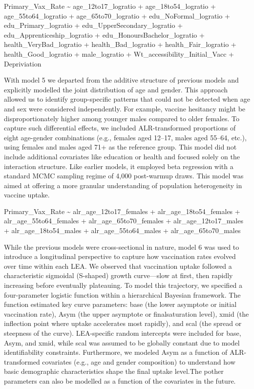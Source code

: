 \documentclass{article}
\begin{document}
Primary\_Vax\_Rate \textasciitilde{} age\_12to17\_logratio +
age\_18to54\_logratio + age\_55to64\_logratio + age\_65to70\_logratio +
edu\_NoFormal\_logratio + edu\_Primary\_logratio +
edu\_UpperSecondary\_logratio + edu\_Apprenticeship\_logratio +
edu\_HonoursBachelor\_logratio + health\_VeryBad\_logratio +
health\_Bad\_logratio + health\_Fair\_logratio + health\_Good\_logratio
+ male\_logratio + Wt\_accessibility\_Initial\_Vacc + Depriviation

With model 5 we departed from the additive structure of previous models
and explicitly modelled the joint distribution of age and gender. This
approach allowed us to identify group-specific patterns that could not
be detected when age and sex were considered independently. For example,
vaccine hesitancy might be disproportionately higher among younger males
compared to older females. To capture such differential effects, we
included ALR-transformed proportions of eight age-gender combinations
(e.g., females aged 12--17, males aged 55--64, etc.), using females and
males aged 71+ as the reference group. This model did not include
additional covariates like education or health and focused solely on the
interaction structure. Like earlier models, it employed beta regression
with a standard MCMC sampling regime of 4,000 post-warmup draws. This
model was aimed at offering a more granular understanding of population
heterogeneity in vaccine uptake.

Primary\_Vax\_Rate \textasciitilde{} alr\_age\_12to17\_females +
alr\_age\_18to54\_females + alr\_age\_55to64\_females +
alr\_age\_65to70\_females + alr\_age\_12to17\_males +
alr\_age\_18to54\_males + alr\_age\_55to64\_males +
alr\_age\_65to70\_males

While the previous models were cross-sectional in nature, model 6 was
used to introduce a longitudinal perspective to capture how vaccination
rates evolved over time within each LEA. We observed that vaccination
uptake followed a characteristic sigmoidal (S-shaped) growth
curve---slow at first, then rapidly increasing before eventually
plateauing. To model this trajectory, we specified a four-parameter
logistic function within a hierarchical Bayesian framework. The function
estimated key curve parameters: base (the lower asymptote or initial
vaccination rate), Asym (the upper asymptote or finalsaturation level),
xmid (the inflection point where uptake accelerates most rapidly), and
scal (the spread or steepness of the curve). LEA-specific random
intercepts were included for base, Asym, and xmid, while scal was
assumed to be globally constant due to model identifiability
constraints. Furthermore, we modeled Asym as a function of
ALR-transformed covariates (e.g., age and gender composition) to
understand how basic demographic characteristics shape the final uptake
level.The pother parameters can also be modelled as a function of the
covariates in the future.
\end{document}

